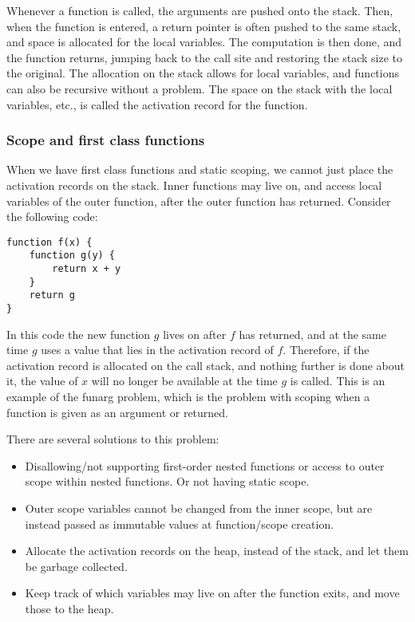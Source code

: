 \documentclass[11pt]{report}
\begin{document}
Whenever a function is called, the arguments are pushed onto the stack. Then, when the function is entered, a return pointer is often pushed to the same stack, and space is allocated for the local variables. The computation is then done, and the function returns, jumping back to the call site and restoring the stack size to the original.
The allocation on the stack allows for local variables, and functions can also be recursive without a problem. The space on the stack with the local variables, etc., is called the activation record for the function.

\subsubsection{Scope and first class functions}

When we have first class functions and static scoping, we cannot just place the activation records on the stack. Inner functions may live on, and access local variables of the outer function, after the outer function has returned. Consider the following code:
\begin{verbatim}
function f(x) {
    function g(y) {
        return x + y
    }
    return g
}
\end{verbatim}

In this code the new function $g$ lives on after $f$ has returned, and at the same time $g$ uses a value that lies in the activation record of $f$. Therefore, if the activation record is allocated on the call stack, and nothing further is done about it, the value of $x$ will no longer be available at the time $g$ is called.
This is an example of the funarg problem, which is the problem with scoping when a function is given as an argument or returned.
\label{funarg}

There are several solutions to this problem:
\begin{itemize}
\item Disallowing/not supporting first-order nested functions or access to outer scope within nested functions. Or not having static scope.
\item Outer scope variables cannot be changed from the inner scope, but are instead passed as immutable values at function/scope creation. 
\item Allocate the activation records on the heap, instead of the stack, and let them be garbage collected. 
\item Keep track of which variables may live on after the function exits, and move those to the heap.
\end{itemize}
\end{document}
